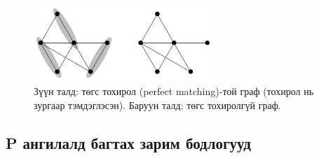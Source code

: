 \begin{figure}[h]
  \centering
  \includegraphics[width=0.6\textwidth]{figs/3.png}
  \caption{Зүүн талд: төгс тохирол (perfect matching)-той граф (тохирол нь зургаар тэмдэглэсэн). Баруун талд: төгс тохиролгүй граф.}
  \label{fig:3-1}
\end{figure}


\subsection{P ангилалд багтах зарим бодлогууд}


